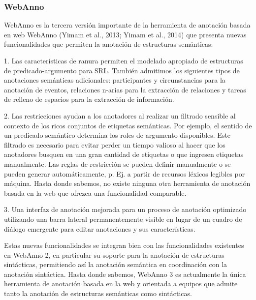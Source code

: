 \subsubsection*{WebAnno}

WebAnno es la tercera versión importante de la herramienta de anotación basada en web WebAnno (Yimam et al., 2013; Yimam et al., 2014) que presenta nuevas funcionalidades que permiten la anotación de estructuras semánticas:

1. Las características de ranura permiten el modelado apropiado de estructuras de predicado-argumento para SRL. También admitimos los siguientes tipos de anotaciones semánticas adicionales: participantes y circunstancias para la anotación de eventos, relaciones n-arias para la extracción de relaciones y tareas de relleno de espacios para la extracción de información.

2. Las restricciones ayudan a los anotadores al realizar un filtrado sensible al contexto de los ricos conjuntos de etiquetas semánticas. Por ejemplo, el sentido de un predicado semántico determina los roles de argumento disponibles. Este filtrado es necesario para evitar perder un tiempo valioso al hacer que los anotadores busquen en una gran cantidad de etiquetas o que ingresen etiquetas manualmente. Las reglas de restricción se pueden definir manualmente o se pueden generar automáticamente, p. Ej. a partir de recursos léxicos legibles por máquina. Hasta donde sabemos, no existe ninguna otra herramienta de anotación basada en la web que ofrezca una funcionalidad comparable.

3. Una interfaz de anotación mejorada para un proceso de anotación optimizado utilizando una barra lateral permanentemente visible en lugar de un cuadro de diálogo emergente para editar anotaciones y sus características.

Estas nuevas funcionalidades se integran bien con las funcionalidades existentes en WebAnno 2, en particular su soporte para la anotación de estructuras sintácticas, permitiendo así la anotación semántica en coordinación con la anotación sintáctica. Hasta donde sabemos, WebAnno 3 es actualmente la única herramienta de anotación basada en la web y orientada a equipos que admite tanto la anotación de estructuras semánticas como sintácticas.


